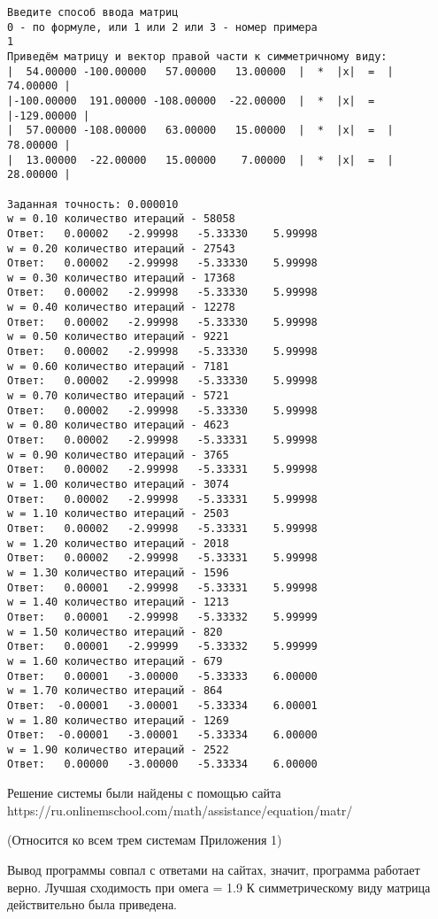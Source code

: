 \documentclass[a4paper,12pt,titlepage,finall]{article}
\begin{document}
\begin{verbatim}
Введите способ ввода матриц
0 - по формуле, или 1 или 2 или 3 - номер примера
1
Приведём матрицу и вектор правой части к симметричному виду:
|  54.00000 -100.00000   57.00000   13.00000  |  *  |x|  =  |  74.00000 |
|-100.00000  191.00000 -108.00000  -22.00000  |  *  |x|  =  |-129.00000 |
|  57.00000 -108.00000   63.00000   15.00000  |  *  |x|  =  |  78.00000 |
|  13.00000  -22.00000   15.00000    7.00000  |  *  |x|  =  |  28.00000 |

Заданная точность: 0.000010
w = 0.10 количество итераций - 58058
Ответ:   0.00002   -2.99998   -5.33330    5.99998 
w = 0.20 количество итераций - 27543
Ответ:   0.00002   -2.99998   -5.33330    5.99998 
w = 0.30 количество итераций - 17368
Ответ:   0.00002   -2.99998   -5.33330    5.99998 
w = 0.40 количество итераций - 12278
Ответ:   0.00002   -2.99998   -5.33330    5.99998 
w = 0.50 количество итераций - 9221
Ответ:   0.00002   -2.99998   -5.33330    5.99998 
w = 0.60 количество итераций - 7181
Ответ:   0.00002   -2.99998   -5.33330    5.99998 
w = 0.70 количество итераций - 5721
Ответ:   0.00002   -2.99998   -5.33330    5.99998 
w = 0.80 количество итераций - 4623
Ответ:   0.00002   -2.99998   -5.33331    5.99998 
w = 0.90 количество итераций - 3765
Ответ:   0.00002   -2.99998   -5.33331    5.99998 
w = 1.00 количество итераций - 3074
Ответ:   0.00002   -2.99998   -5.33331    5.99998 
w = 1.10 количество итераций - 2503
Ответ:   0.00002   -2.99998   -5.33331    5.99998 
w = 1.20 количество итераций - 2018
Ответ:   0.00002   -2.99998   -5.33331    5.99998 
w = 1.30 количество итераций - 1596
Ответ:   0.00001   -2.99998   -5.33331    5.99998 
w = 1.40 количество итераций - 1213
Ответ:   0.00001   -2.99998   -5.33332    5.99999 
w = 1.50 количество итераций - 820
Ответ:   0.00001   -2.99999   -5.33332    5.99999 
w = 1.60 количество итераций - 679
Ответ:   0.00001   -3.00000   -5.33333    6.00000 
w = 1.70 количество итераций - 864
Ответ:  -0.00001   -3.00001   -5.33334    6.00001 
w = 1.80 количество итераций - 1269
Ответ:  -0.00001   -3.00001   -5.33334    6.00000 
w = 1.90 количество итераций - 2522
Ответ:   0.00000   -3.00000   -5.33334    6.00000 

\end{verbatim}

Решение системы были найдены с помощью сайта
https://ru.onlinemschool.com/math/assistance/equation/matr/

(Относится ко всем трем системам Приложения 1)

Вывод программы совпал с ответами на сайтах, значит, программа работает верно.
Лучшая сходимость при омега = 1.9
К симметрическому виду матрица действительно была приведена.
\end{document}
